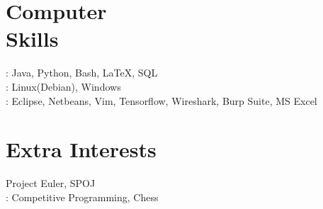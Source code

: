 \documentclass[mm]{simple_style}
\begin{document}
\begin{resume}
\section{Computer\\Skills}
: Java, Python, Bash, \LaTeX, SQL 
\\
: Linux(Debian), Windows
\\
: Eclipse, Netbeans, Vim, Tensorflow, Wireshark, Burp Suite, MS Excel\\
\sectionline

\section{Extra Interests}
\cusemph{}Project Euler, SPOJ\\
: Competitive Programming, Chess\\
\sectionline
\end{resume}
\end{document}
